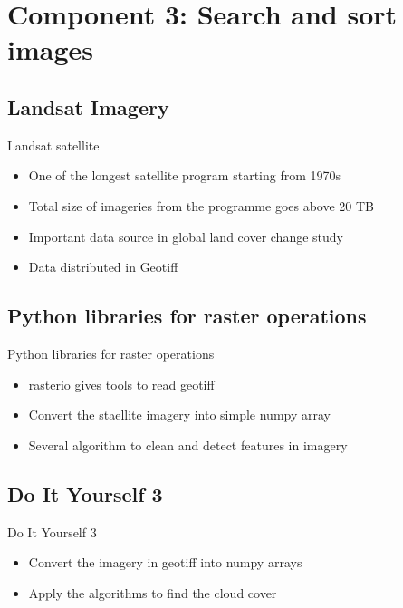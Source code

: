 \section[Component 3]{Component 3: Search and sort images}
\subsection[Landsat Imagery]{Landsat Imagery}


\begin{frame}{Landsat satellite}
	\begin{beamerboxesrounded}{}
		\begin{itemize}
\item One of the longest satellite program starting from 1970s
\item Total size of imageries from the programme goes above 20 TB
\item Important data source in global land cover change study
\item Data distributed in Geotiff
\end{itemize}
\end{beamerboxesrounded}
\end{frame}

\subsection[Landsat Imagery]{Python libraries for raster operations}

\begin{frame}{Python libraries for raster operations}
\begin{beamerboxesrounded}{}
	\begin{itemize}
\item rasterio gives tools to read geotiff
\item Convert the staellite imagery into simple numpy array
\item Several algorithm to clean and detect features in imagery
\end{itemize}
\end{beamerboxesrounded}
\end{frame}

\subsection[Landsat Imagery]{Do It Yourself 3}

\begin{frame}{Do It Yourself 3}
\begin{beamerboxesrounded}{}
	\begin{itemize}
\item Convert the imagery in geotiff into numpy arrays 
\item Apply the algorithms to find the cloud cover
\end{itemize}
\end{beamerboxesrounded}
\end{frame}